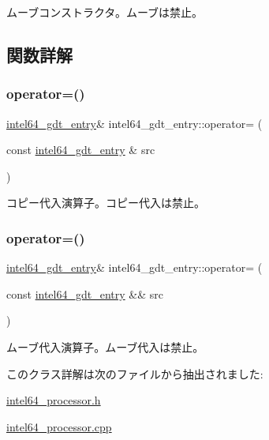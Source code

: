 ムーブコンストラクタ。ムーブは禁止。 

\subsection{関数詳解}
\hypertarget{classintel64__gdt__entry_ac94d67eede4e2d4c2584444cd671adb3}{}\label{classintel64__gdt__entry_ac94d67eede4e2d4c2584444cd671adb3} 
\subsubsection{\texorpdfstring{operator=()}{operator=()}\hspace{0.1cm}{\footnotesize\ttfamily [1/2]}}
{\footnotesize\ttfamily \hyperlink{classintel64__gdt__entry}{intel64\+\_\+gdt\+\_\+entry}\& intel64\+\_\+gdt\+\_\+entry\+::operator= (\begin{DoxyParamCaption}\item[{const \hyperlink{classintel64__gdt__entry}{intel64\+\_\+gdt\+\_\+entry} \&}]{src }\end{DoxyParamCaption})\hspace{0.3cm}{\ttfamily [delete]}}

コピー代入演算子。コピー代入は禁止。 \hypertarget{classintel64__gdt__entry_aa80cb4acf6c8ae6455e7db41963bf206}{}\label{classintel64__gdt__entry_aa80cb4acf6c8ae6455e7db41963bf206} 
\subsubsection{\texorpdfstring{operator=()}{operator=()}\hspace{0.1cm}{\footnotesize\ttfamily [2/2]}}
{\footnotesize\ttfamily \hyperlink{classintel64__gdt__entry}{intel64\+\_\+gdt\+\_\+entry}\& intel64\+\_\+gdt\+\_\+entry\+::operator= (\begin{DoxyParamCaption}\item[{const \hyperlink{classintel64__gdt__entry}{intel64\+\_\+gdt\+\_\+entry} \&\&}]{src }\end{DoxyParamCaption})\hspace{0.3cm}{\ttfamily [delete]}}

ムーブ代入演算子。ムーブ代入は禁止。 

このクラス詳解は次のファイルから抽出されました\+:\begin{DoxyCompactItemize}
\item 
\hyperlink{intel64__processor_8h}{intel64\+\_\+processor.\+h}\item 
\hyperlink{intel64__processor_8cpp}{intel64\+\_\+processor.\+cpp}\end{DoxyCompactItemize}

